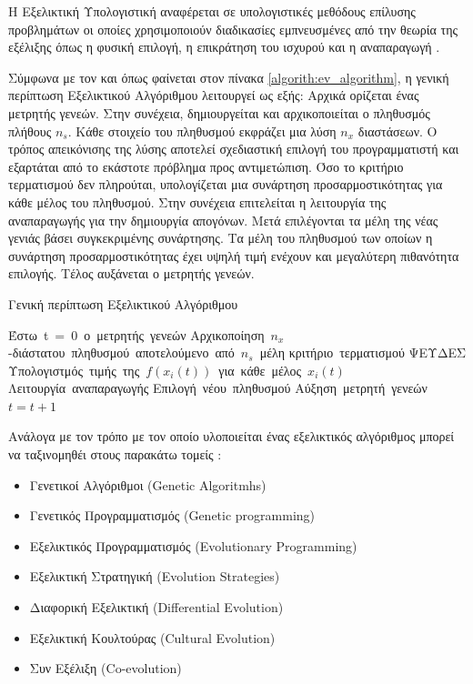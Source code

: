 \documentclass{assignment}
\begin{document}
Η Εξελικτική Υπολογιστική αναφέρεται σε υπολογιστικές μεθόδους επίλυσης
προβλημάτων οι οποίες χρησιμοποιούν διαδικασίες εμπνευσμένες από την θεωρία
της εξέλιξης όπως η φυσική επιλογή, η επικράτηση του ισχυρού και η
αναπαραγωγή \cite{engelbrecht}.

Σύμφωνα με τον \citet{engelbrecht} και όπως φαίνεται στον πίνακα
\ref{algorith:ev_algorithm}, η γενική
περίπτωση Εξελικτικού Αλγόριθμου λειτουργεί ως εξής: Αρχικά ορίζεται ένας
μετρητής γενεών. Στην συνέχεια, δημιουργείται και αρχικοποιείται ο πληθυσμός
πλήθους $n_s$. Κάθε στοιχείο του πληθυσμού εκφράζει μια λύση $n_x$ διαστάσεων.
Ο τρόπος απεικόνισης της λύσης αποτελεί σχεδιαστική επιλογή του προγραμματιστή
και εξαρτάται από το εκάστοτε πρόβλημα προς αντιμετώπιση. Όσο το κριτήριο
τερματισμού δεν πληρούται, υπολογίζεται μια συνάρτηση προσαρμοστικότητας για
κάθε μέλος του πληθυσμού. Στην συνέχεια επιτελείται η λειτουργία της
αναπαραγωγής για την δημιουργία απογόνων. Μετά επιλέγονται τα μέλη της νέας
γενιάς βάσει συγκεκριμένης συνάρτησης. Τα μέλη του πληθυσμού των οποίων
η συνάρτηση προσαρμοστικότητας έχει υψηλή τιμή ενέχουν και μεγαλύτερη πιθανότητα
επιλογής. Τέλος αυξάνεται ο μετρητής γενεών.
\begin{algorithm}                        %
\caption{Γενική περίπτωση Εξελικτικού Αλγόριθμου}          %
\label{algorith:ev_algorithm}                      %
\begin{program}
    \mbox{Έστω t = 0 ο μετρητής γενεών}
    \mbox{Αρχικοποίηση $n_x$-διάστατου πληθυσμού αποτελούμενο από $n_s$ μέλη}
    \WHILE \mbox{κριτήριο τερματισμού} \mbox{ΨΕΥΔΕΣ} \DO
        \mbox{Υπολογιστμός τιμής της $f(x_i(t))$ για κάθε μέλος $x_i(t)$}
        \mbox{Λειτουργία αναπαραγωγής}
        \mbox{Επιλογή νέου πληθυσμού}
        \mbox{Αύξηση μετρητή γενεών $t = t + 1$}
    \END
\end{program}
\end{algorithm}

Ανάλογα με τον τρόπο με τον οποίο υλοποιείται ένας εξελικτικός αλγόριθμος
μπορεί να ταξινομηθέι στους παρακάτω τομείς \cite{engelbrecht}:
\begin{itemize}
    \item Γενετικοί Αλγόριθμοι (Genetic Algoritmhs)
    \item Γενετικός Προγραμματισμός (Genetic programming)
    \item Εξελικτικός Προγραμματισμός (Evolutionary Programming)
    \item Εξελικτική Στρατηγική (Evolution Strategies)
    \item Διαφορική Εξελικτική (Differential Evolution)
    \item Εξελικτική Κουλτούρας (Cultural Evolution)
    \item Συν Εξέλιξη (Co-evolution)
\end{itemize}
\end{document}
